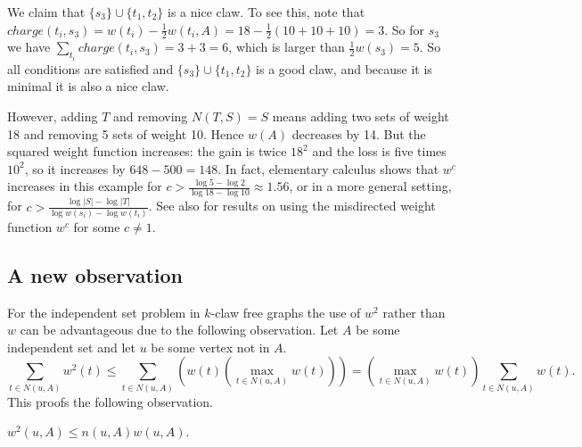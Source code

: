 We claim that $\{s_3\} \cup \{t_1, t_2\}$ is a nice claw. To see this, note that $charge(t_i,s_3) = w(t_i) - \frac{1}{2}w(t_i,A) = 18 - \frac{1}{2}(10 + 10 + 10) = 3$. So for $s_3$ we have $\sum_{t_i} charge(t_i,s_3) = 3 + 3 = 6$, which is larger than $\frac{1}{2}w(s_3) = 5$. So all conditions are satisfied and $\{s_3\} \cup \{t_1, t_2\}$ is a good claw, and because it is minimal it is also a nice claw.

However, adding $T$ and removing $N(T,S) = S$ means adding two sets of weight 18 and removing 5 sets of weight 10. Hence $w(A)$ decreases by 14. But the squared weight function increases: the gain is twice $18^2$ and the loss is five times $10^2$, so it increases by $648 - 500 = 148$. In fact, elementary calculus shows that $w^c$ increases in this example for $c > \frac{\log 5 - \log 2}{\log 18 - \log 10} \approx 1.56$, or in a more general setting, for $c > \frac{\log |S| - \log |T|}{\log w(s_i) - \log w(t_i)}$. See also \cite{BermanWeighted2} for results on using the misdirected weight function $w^c$ for some $c \neq 1$.


\subsection{A new observation}\label{subsec:Observation}

For the independent set problem in $k$-claw free graphs the use of $w^2$ rather than $w$ can be advantageous due to the following observation. Let $A$ be some independent set and let $u$ be some vertex not in $A$.
%
\begin{equation*}
\sum_{t \in N(u,A)} w^2(t) \leq \sum_{t \in N(u,A)} \left( w(t) \left( \max_{t \in N(u,A)} w(t) \right) \right) = \left( \max_{t \in N(u,A)} w(t) \right) \sum_{t \in N(u,A)} w(t).
\end{equation*}
%
This proofs the following observation.
%
\begin{obs}\label{obs}
$w^2(u,A) \leq n(u,A) w(u,A)$.
\end{obs}

